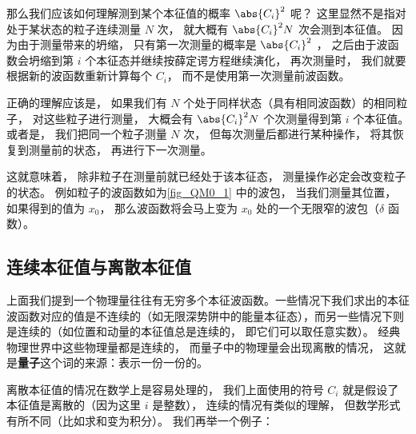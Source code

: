 那么我们应该如何理解测到某个本征值的概率 $\abs{C_i}^2$ 呢？ 这里显然不是指对处于某状态的粒子连续测量 $N$ 次， 就大概有 $\abs{C_i}^2 N$ 次会测到本征值。 因为由于测量带来的坍缩， 只有第一次测量的概率是 $\abs{C_i}^2$ ， 之后由于波函数会坍缩到第 $i$ 个本征态并继续按薛定谔方程继续演化， 再次测量时， 我们就要根据新的波函数重新计算每个 $C_i$， 而不是使用第一次测量前波函数。

正确的理解应该是， 如果我们有 $N$ 个处于同样状态（具有相同波函数）的相同粒子， 对这些粒子进行测量， 大概会有 $\abs{C_i}^2 N$ 个次测量得到第 $i$ 个本征值。 或者是， 我们把同一个粒子测量 $N$ 次， 但每次测量后都进行某种操作， 将其恢复到测量前的状态， 再进行下一次测量。

这就意味着， 除非粒子在测量前就已经处于该本征态， 测量操作必定会改变粒子的状态。 例如粒子的波函数如为\autoref{fig_QM0_1} 中的波包， 当我们测量其位置， 如果得到的值为 $x_0$， 那么波函数将会马上变为 $x_0$ 处的一个无限窄的波包（$\delta$ 函数）。

\subsection{连续本征值与离散本征值}
上面我们提到一个物理量往往有无穷多个本征波函数。一些情况下我们求出的本征波函数对应的值是不连续的（如无限深势阱中的能量本征态），而另一些情况下则是连续的（如位置和动量的本征值总是连续的， 即它们可以取任意实数）。 经典物理世界中这些物理量都是连续的， 而量子中的物理量会出现离散的情况， 这就是\textbf{量子}这个词的来源：表示一份一份的。

离散本征值的情况在数学上是容易处理的， 我们上面使用的符号 $C_i$ 就是假设了本征值是离散的（因为这里 $i$ 是整数）， 连续的情况有类似的理解， 但数学形式有所不同（比如求和变为积分）。 我们再举一个例子：


